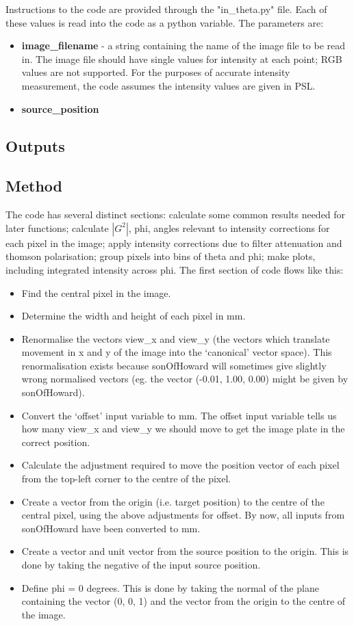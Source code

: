 \documentclass{report}
\begin{document}
Instructions to the code are provided through the "in\_theta.py" file. Each of these values is read into the code as a python variable. The parameters are:

\begin{itemize}
\item \textbf{image\_filename} - a string containing the name of the image file to be read in. The image file should have single values for intensity at each point; RGB values are not supported. For the purposes of accurate intensity measurement, the code assumes the intensity values are given in PSL. 
\item \textbf{source\_position}
\end{itemize}

\subsection{Outputs}

\subsection{Method}

The code has several distinct sections: calculate some common results needed for later functions; calculate $|G^2|$, phi, angles relevant to intensity corrections for each pixel in the image; apply intensity corrections due to filter attenuation and thomson polarisation; group pixels into bins of theta and phi; make plots, including integrated intensity across phi.
The first section of code flows like this:

\begin{itemize}
\item Find the central pixel in the image.
\item Determine the width and height of each pixel in mm.
\item Renormalise the vectors view\_x and view\_y (the vectors which translate movement in x and y of the image into the `canonical' vector space). This renormalisation exists because sonOfHoward will sometimes give slightly wrong normalised vectors (eg. the vector (-0.01, 1.00, 0.00) might be given by sonOfHoward).
\item  Convert the `offset' input variable to mm. The offset input variable tells us how many view\_x and view\_y we should move to get the image plate in the correct position.
\item Calculate the adjustment required to move the position vector of each pixel from the top-left corner to the centre of the pixel.
\item Create a vector from the origin (i.e. target position) to the centre of the central pixel, using the above adjustments for offset. By now, all inputs from sonOfHoward have been converted to mm. 
\item Create a vector and unit vector from the source position to the origin. This is done by taking the negative of the input source position. 
\item Define phi = 0 degrees. This is done by taking the normal of the plane containing the vector (0, 0, 1) and the vector from the origin to the centre of the image. 
\end{itemize}
\end{document}
